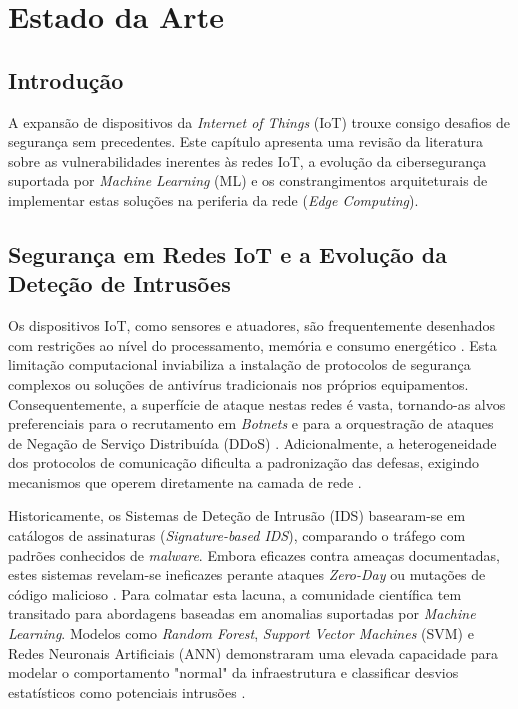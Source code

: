 \chapter{Estado da Arte}
\label{chap:estado_arte}

\section{Introdução}
\label{sec:ea_introducao}
A expansão de dispositivos da \textit{Internet of Things} (IoT) trouxe consigo desafios de segurança sem precedentes. Este capítulo apresenta uma revisão da literatura sobre as vulnerabilidades inerentes às redes IoT, a evolução da cibersegurança suportada por \textit{Machine Learning} (ML) e os constrangimentos arquiteturais de implementar estas soluções na periferia da rede (\textit{Edge Computing}).

\section{Segurança em Redes IoT e a Evolução da Deteção de Intrusões}
\label{sec:ea_seguranca_ids}
Os dispositivos IoT, como sensores e atuadores, são frequentemente desenhados com restrições ao nível do processamento, memória e consumo energético \cite{scavenging}. Esta limitação computacional inviabiliza a instalação de protocolos de segurança complexos ou soluções de antivírus tradicionais nos próprios equipamentos. Consequentemente, a superfície de ataque nestas redes é vasta, tornando-as alvos preferenciais para o recrutamento em \textit{Botnets} e para a orquestração de ataques de Negação de Serviço Distribuída (DDoS) \cite{Baccelli2019}. Adicionalmente, a heterogeneidade dos protocolos de comunicação dificulta a padronização das defesas, exigindo mecanismos que operem diretamente na camada de rede \cite{IEEE_Anomalias_2021}.

Historicamente, os Sistemas de Deteção de Intrusão (IDS) basearam-se em catálogos de assinaturas (\textit{Signature-based IDS}), comparando o tráfego com padrões conhecidos de \textit{malware}. Embora eficazes contra ameaças documentadas, estes sistemas revelam-se ineficazes perante ataques \textit{Zero-Day} ou mutações de código malicioso \cite{AlGaradi2020}. Para colmatar esta lacuna, a comunidade científica tem transitado para abordagens baseadas em anomalias suportadas por \textit{Machine Learning}. Modelos como \textit{Random Forest}, \textit{Support Vector Machines} (SVM) e Redes Neuronais Artificiais (ANN) demonstraram uma elevada capacidade para modelar o comportamento "normal" da infraestrutura e classificar desvios estatísticos como potenciais intrusões \cite{Berman2019}.

